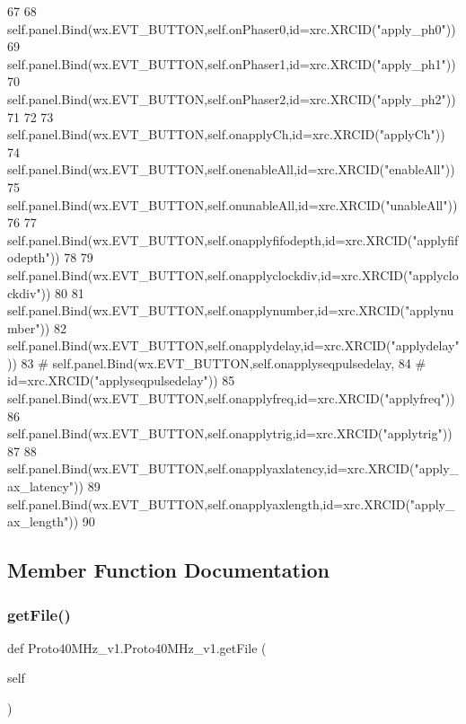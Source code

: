 \begin{DoxyCode}
67 
68         self.panel.Bind(wx.EVT\_BUTTON,self.onPhaser0,id=xrc.XRCID(\textcolor{stringliteral}{"apply\_ph0"}))
69         self.panel.Bind(wx.EVT\_BUTTON,self.onPhaser1,id=xrc.XRCID(\textcolor{stringliteral}{"apply\_ph1"}))
70         self.panel.Bind(wx.EVT\_BUTTON,self.onPhaser2,id=xrc.XRCID(\textcolor{stringliteral}{"apply\_ph2"}))
71 
72         
73         self.panel.Bind(wx.EVT\_BUTTON,self.onapplyCh,id=xrc.XRCID(\textcolor{stringliteral}{"applyCh"}))
74         self.panel.Bind(wx.EVT\_BUTTON,self.onenableAll,id=xrc.XRCID(\textcolor{stringliteral}{"enableAll"}))
75         self.panel.Bind(wx.EVT\_BUTTON,self.onunableAll,id=xrc.XRCID(\textcolor{stringliteral}{"unableAll"}))
76 
77         self.panel.Bind(wx.EVT\_BUTTON,self.onapplyfifodepth,id=xrc.XRCID(\textcolor{stringliteral}{"applyfifodepth"}))
78 
79         self.panel.Bind(wx.EVT\_BUTTON,self.onapplyclockdiv,id=xrc.XRCID(\textcolor{stringliteral}{"applyclockdiv"}))
80 
81         self.panel.Bind(wx.EVT\_BUTTON,self.onapplynumber,id=xrc.XRCID(\textcolor{stringliteral}{"applynumber"}))
82         self.panel.Bind(wx.EVT\_BUTTON,self.onapplydelay,id=xrc.XRCID(\textcolor{stringliteral}{"applydelay"}))
83 \textcolor{comment}{#        self.panel.Bind(wx.EVT\_BUTTON,self.onapplyseqpulsedelay,}
84 \textcolor{comment}{#                        id=xrc.XRCID("applyseqpulsedelay"))}
85         self.panel.Bind(wx.EVT\_BUTTON,self.onapplyfreq,id=xrc.XRCID(\textcolor{stringliteral}{"applyfreq"}))
86         self.panel.Bind(wx.EVT\_BUTTON,self.onapplytrig,id=xrc.XRCID(\textcolor{stringliteral}{"applytrig"}))
87 
88         self.panel.Bind(wx.EVT\_BUTTON,self.onapplyaxlatency,id=xrc.XRCID(\textcolor{stringliteral}{"apply\_ax\_latency"}))
89         self.panel.Bind(wx.EVT\_BUTTON,self.onapplyaxlength,id=xrc.XRCID(\textcolor{stringliteral}{"apply\_ax\_length"}))
90 
\end{DoxyCode}


\subsection{Member Function Documentation}
\mbox{\label{classProto40MHz__v1_1_1Proto40MHz__v1_aaa7351162eec817a5e459af1ed1d6a70}} 
\subsubsection{\texorpdfstring{get\+File()}{getFile()}}
{\footnotesize\ttfamily def Proto40\+M\+Hz\+\_\+v1.\+Proto40\+M\+Hz\+\_\+v1.\+get\+File (\begin{DoxyParamCaption}\item[{}]{self }\end{DoxyParamCaption})}



